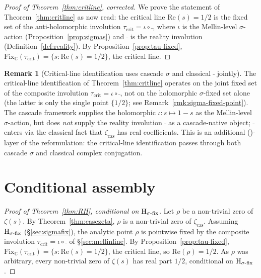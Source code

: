 \documentclass[11pt, a4paper]{amsart}
\theoremstyle{definition}
\newtheorem{remark}[theorem]{Remark}
\newcommand{\C}{\mathbb{C}}
\newcommand{\zetacas}{\zeta_{\mathrm{cas}}}
\begin{document}
\begin{proof}[Proof of Theorem~\ref{thm:critline}, corrected]
We prove the statement of Theorem~\ref{thm:critline} as now read:
the critical line $\mathrm{Re}(s) = 1/2$ is the fixed set of the
anti-holomorphic involution $\tau_{\mathrm{crit}} = \iota \circ \bar{\ }$,
where $\iota$ is the Mellin-level $\sigma$-action
(Proposition~\ref{prop:sigmas}) and $\bar{\ }$ is the reality
involution (Definition~\ref{def:reality}). By
Proposition~\ref{prop:tau-fixed},
$\mathrm{Fix}_\C(\tau_{\mathrm{crit}}) = \{s : \mathrm{Re}(s) = 1/2\}$,
the critical line.
\end{proof}

\begin{remark}[Critical-line identification uses cascade $\sigma$ and classical $\bar{\ }$ jointly]\label{rmk:critline-rewriting}
The critical-line identification of Theorem~\ref{thm:critline}
operates on the joint fixed set of the composite involution
$\tau_{\mathrm{crit}} = \iota \circ \bar{\ }$, not on the holomorphic
$\sigma$-fixed set alone (the latter is only the single point
$\{1/2\}$; see Remark~\ref{rmk:sigma-fixed-point}). The cascade
framework supplies the holomorphic $\iota: s \mapsto 1-s$ as the
Mellin-level $\sigma$-action, but does \emph{not} supply the
reality involution $\bar{\ }$ as a cascade-native object;
$\bar{\ }$ enters via the classical fact that $\zetacas$
has real coefficients. This is an additional (\textdelta)-layer
of the reformulation: the critical-line identification passes
through both cascade $\sigma$ and classical complex conjugation.
\end{remark}

\section{Conditional assembly}\label{sec:proof}

\begin{proof}[Proof of Theorem~\ref{thm:RH}, conditional on
$\textup{H}_{\sigma\text{-fix}}$]
Let $\rho$ be a non-trivial zero of $\zeta(s)$. By
Theorem~\ref{thm:casczeta}, $\rho$ is a non-trivial zero of
$\zetacas$. Assuming $\textup{H}_{\sigma\text{-fix}}$
(\S\ref{sec:sigmafix}), the analytic point $\rho$ is pointwise
fixed by the composite involution
$\tau_{\mathrm{crit}} = \iota \circ \bar{\ }$ of \S\ref{sec:mellinline}.
By Proposition~\ref{prop:tau-fixed},
$\mathrm{Fix}_\C(\tau_{\mathrm{crit}}) = \{s : \mathrm{Re}(s) = 1/2\}$,
the critical line, so $\mathrm{Re}(\rho) = 1/2$. As $\rho$ was
arbitrary, every non-trivial zero of $\zeta(s)$ has real part
$1/2$, conditional on $\textup{H}_{\sigma\text{-fix}}$.
\end{proof}
\end{document}
